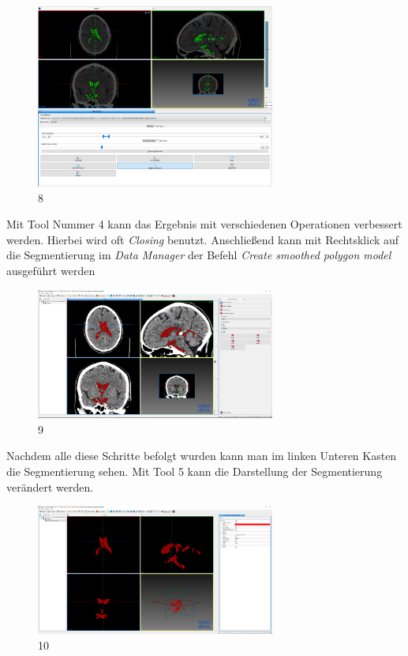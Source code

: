 \begin{figure}[H] 
\centering 
\includegraphics[width=0.7\textwidth]{Logos/MITK_Doku/8.PNG}
\caption{8} 
\label{fig:acht} 
\end{figure}

Mit Tool Nummer 4 kann das Ergebnis mit verschiedenen Operationen verbessert werden. Hierbei wird oft \textit{Closing} benutzt. Anschließend kann mit Rechtsklick auf die Segmentierung im \textit{Data Manager} der Befehl \textit{Create smoothed polygon model} ausgeführt werden

\begin{figure}[H] 
\centering 
\includegraphics[width=0.7\textwidth]{Logos/MITK_Doku/9.PNG}
\caption{9} 
\label{fig:neun} 
\end{figure}

Nachdem alle diese Schritte befolgt wurden kann man im linken Unteren Kasten die Segmentierung sehen. Mit Tool 5 kann die Darstellung der Segmentierung verändert werden.

\begin{figure}[H] 
\centering 
\includegraphics[width=0.7\textwidth]{Logos/MITK_Doku/10.PNG}
\caption{10} 
\label{fig:zehn} 
\end{figure}